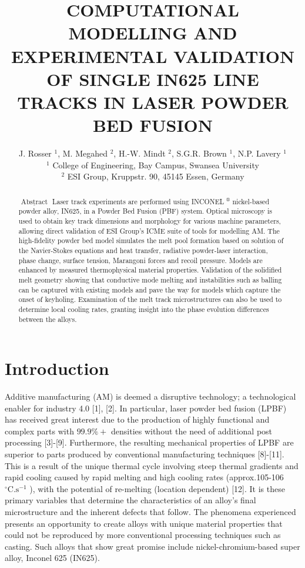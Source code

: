 \documentclass[10pt]{article}
\title{COMPUTATIONAL MODELLING AND EXPERIMENTAL VALIDATION OF SINGLE IN625 LINE TRACKS IN LASER POWDER BED FUSION }
\author{J. Rosser ${ }^{1}$, M. Megahed ${ }^{2}$, H.-W. Mindt ${ }^{2}$, S.G.R. Brown ${ }^{1}$, N.P. Lavery ${ }^{1}$\\
${ }^{1}$ College of Engineering, Bay Campus, Swansea University\\
${ }^{2}$ ESI Group, Kruppstr. 90, 45145 Essen, Germany}
\date{}
\begin{document}
\maketitle


\begin{abstract}
$\underline{\text { Abstract }}$ Laser track experiments are performed using INCONEL ${ }^{\circledR}$ nickel-based powder alloy, IN625, in a Powder Bed Fusion (PBF) system. Optical microscopy is used to obtain key track dimensions and morphology for various machine parameters, allowing direct validation of ESI Group's ICME suite of tools for modelling AM. The high-fidelity powder bed model simulates the melt pool formation based on solution of the Navier-Stokes equations and heat transfer, radiative powder-laser interaction, phase change, surface tension, Marangoni forces and recoil pressure. Models are enhanced by measured thermophysical material properties. Validation of the solidified melt geometry showing that conductive mode melting and instabilities such as balling can be captured with existing models and pave the way for models which capture the onset of keyholing. Examination of the melt track microstructures can also be used to determine local cooling rates, granting insight into the phase evolution differences between the alloys.
\end{abstract}

\section*{Introduction}
Additive manufacturing (AM) is deemed a disruptive technology; a technological enabler for industry 4.0 [1], [2]. In particular, laser powder bed fusion (LPBF) has received great interest due to the production of highly functional and complex parts with $99.9 \%+$ densities without the need of additional post processing [3]-[9]. Furthermore, the resulting mechanical properties of LPBF are superior to parts produced by conventional manufacturing techniques [8]-[11]. This is a result of the unique thermal cycle involving steep thermal gradients and rapid cooling caused by rapid melting and high cooling rates (approx.105-106 ${ }^{\circ} \mathrm{C} . \mathrm{s}^{-1}$ ), with the potential of re-melting (location dependent) [12]. It is these primary variables that determine the characteristics of an alloy's final microstructure and the inherent defects that follow. The phenomena experienced presents an opportunity to create alloys with unique material properties that could not be reproduced by more conventional processing techniques such as casting. Such alloys that show great promise include nickel-chromium-based super alloy, Inconel 625 (IN625).
\end{document}
